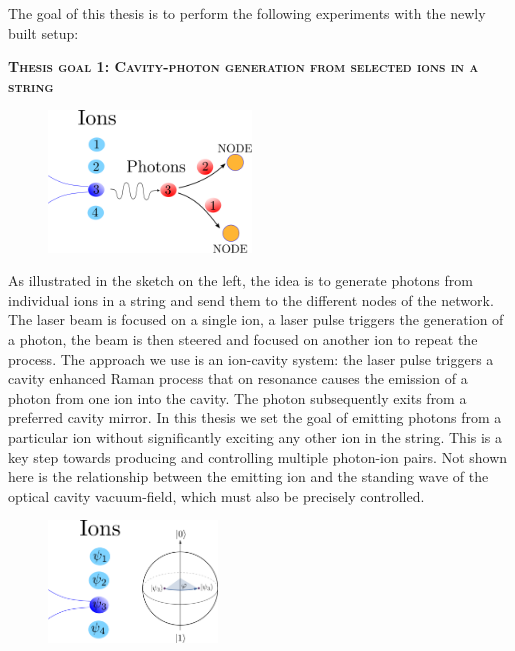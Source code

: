 \documentclass[english, a4paper, 12pt, twoside]{book}
\numberwithin{equation}{section} %
\begin{document}
The goal of this thesis is to perform the following experiments with the newly built setup:\par\noindent%
{\large\textbf{\textsc{Thesis goal 1: Cavity-photon generation from selected ions in a string}}}\\
\begin{figure}
  \centering
    \includegraphics[width=0.48\textwidth]{photongeneration3}
\end{figure}
As illustrated in the sketch on the left, the idea is to generate photons from individual ions in a string and send them to the different nodes of the network. The laser beam is focused on a single ion, a laser pulse triggers the generation of a photon, the beam is then steered and focused on another ion to repeat the process. The approach we use is an ion-cavity system: the laser pulse triggers a cavity enhanced Raman process \cite{stuteinterface} that on resonance causes the emission of a photon from one ion into the cavity. The photon subsequently exits from a preferred cavity mirror. In this thesis we set the goal of emitting photons from a particular ion without significantly exciting any other ion in the string. This is a key step towards producing and controlling multiple photon-ion pairs. Not shown here is the relationship between the emitting ion and the standing wave of the optical cavity vacuum-field, which must also be precisely controlled.\newpage
{}\\
\begin{figure}
\centering
    \includegraphics[width=0.4\textwidth]{qubitmanipulation}
\end{figure}
\end{document}
